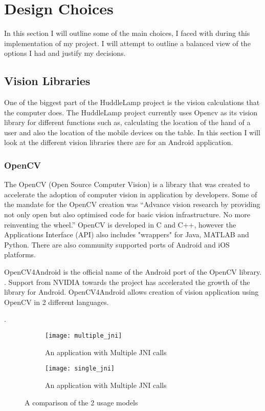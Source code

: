 
 
\section{Design Choices} \label{design_choice_android_camera}
In this section I will outline some of the main choices, I faced with during this implementation of my project. I will attempt to outline a balanced view of the options I had and justify my decisions.
 
\subsection{Vision Libraries}
One of the biggest part of the HuddleLamp project is the vision calculations that the computer does. The HuddleLamp project currently uses Opencv as its vision library for different functions such as, calculating the location of the hand of a user and also the location of the mobile devices on the table. In this section I will look at the different vision libraries there are for an Android application.
 
\subsubsection{OpenCV} \label{opencv_section}
The OpenCV (Open Source Computer Vision) is a library that was created to accelerate the adoption of computer vision in application by developers. Some of the mandate for the OpenCV creation was “Advance vision research by providing not only open but also optimised code for basic vision infrastructure. No more reinventing the wheel.”
\cite{opencv_wiki} 
OpenCV is developed in C and C++, however the Applications Interface (API) also includes "wrappers" for Java, MATLAB and Python. There are also community supported ports of Android and iOS platforms.

OpenCV4Android is the official name of the Android port of the OpenCV library. 
\cite{opencv4android_link}. 
Support from NVIDIA towards the project has accelerated the growth of the library for Android. OpenCV4Android allows creation of vision application using OpenCV in 2  different languages.

\cite{opencv_usage_model}. 
\begin{figure}[H]
    \centering
    \begin{subfigure}[b]{0.47\textwidth}
        \centering
        \texttt{[image: multiple\_jni]}
        \caption{An application with Multiple JNI calls}
    \end{subfigure}
    \hfill
    \begin{subfigure}[b]{0.47\textwidth}
        \centering
        \texttt{[image: single\_jni]}
        \caption{An application with Multiple JNI calls}
    \end{subfigure}
    \hfill
    \caption{A comparison of the 2 usage models\cite{opencv_jni_images}}
     \label{two_usage_models}
\end{figure}


